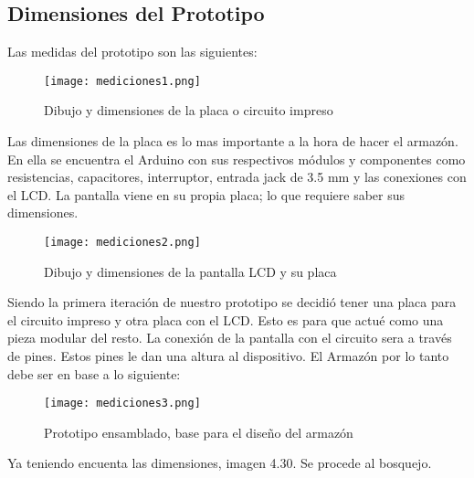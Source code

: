 \subsection{Dimensiones del Prototipo}

\par 
Las medidas del prototipo son las siguientes:

\begin{figure}[H]
	\centering
	\texttt{[image: mediciones1.png]}
	\caption{Dibujo y dimensiones de la placa o circuito impreso}
\end{figure}

\par \noindent
Las dimensiones de la placa es lo mas importante a la hora de hacer el armazón. En ella se encuentra el Arduino con sus respectivos módulos y componentes como resistencias, capacitores, interruptor, entrada jack de 3.5 mm y las conexiones con el LCD. La pantalla viene en su propia placa; lo que requiere saber sus dimensiones.

\begin{figure}[H]
	\centering
	\texttt{[image: mediciones2.png]}
	\caption{Dibujo y dimensiones de la pantalla LCD y su placa}
\end{figure}

\par \noindent
Siendo la primera iteración de nuestro prototipo se decidió tener una placa para el circuito impreso y otra placa con el LCD. Esto es para que actué como una pieza modular del resto. La conexión de la pantalla con el circuito sera a través de pines. Estos pines le dan una altura al dispositivo. El Armazón por lo tanto debe ser en base a lo siguiente:

\begin{figure}[H]
	\centering
	\texttt{[image: mediciones3.png]}
	\caption{Prototipo ensamblado, base para el diseño del armazón}
\end{figure}

\par \noindent
Ya teniendo encuenta las dimensiones, imagen 4.30. Se procede al bosquejo.

